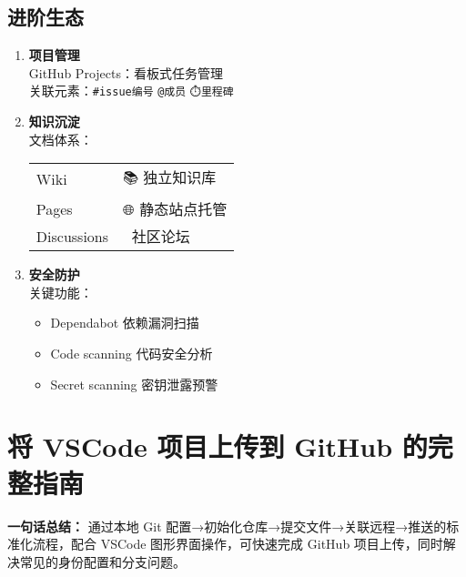 \subsection{进阶生态}
\begin{enumerate}[leftmargin=*, nosep]
    \item \textbf{项目管理}  \\
    GitHub Projects：看板式任务管理 \\
    关联元素：\texttt{\#issue编号} \quad \texttt{@成员} \quad \texttt{⏱️里程碑}
    
    \item \textbf{知识沉淀}  \\
    文档体系：\\
    \begin{tabular}{@{}ll@{}}
        Wiki &  📚 独立知识库 \\
        Pages &  🌐 静态站点托管 \\
        Discussions &  💬 社区论坛 \\
    \end{tabular}
    
    \item \textbf{安全防护}  \\
    关键功能：\\
    
\begin{minipage}[t]{0.9\textwidth}
    \vspace{-2ex}
    \begin{itemize}[nosep,leftmargin=*]
        \item Dependabot 依赖漏洞扫描
        \item Code scanning 代码安全分析
        \item Secret scanning 密钥泄露预警
    \end{itemize}
    \end{minipage}
\end{enumerate}


\section{将 VSCode 项目上传到 GitHub 的完整指南}

\textbf{一句话总结：}
通过本地 Git 配置→初始化仓库→提交文件→关联远程→推送的标准化流程，配合 VSCode 图形界面操作，可快速完成 GitHub 项目上传，同时解决常见的身份配置和分支问题。


